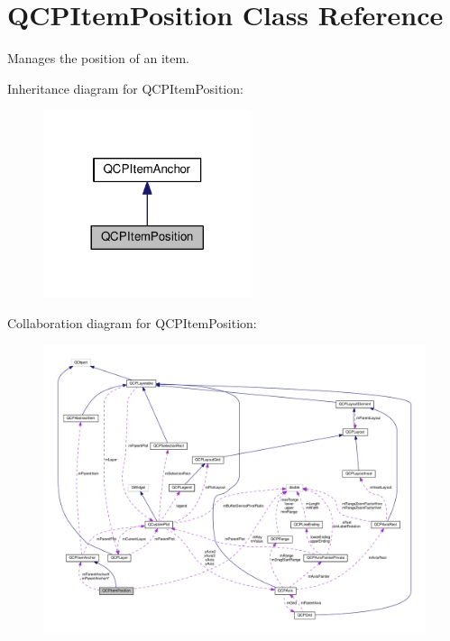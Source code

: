 \hypertarget{classQCPItemPosition}{}\section{Q\+C\+P\+Item\+Position Class Reference}
\label{classQCPItemPosition}


Manages the position of an item.  




Inheritance diagram for Q\+C\+P\+Item\+Position\+:
\nopagebreak
\begin{figure}[H]
\begin{center}
\leavevmode
\includegraphics[width=173pt]{classQCPItemPosition__inherit__graph}
\end{center}
\end{figure}


Collaboration diagram for Q\+C\+P\+Item\+Position\+:
\nopagebreak
\begin{figure}[H]
\begin{center}
\leavevmode
\includegraphics[width=350pt]{classQCPItemPosition__coll__graph}
\end{center}
\end{figure}
